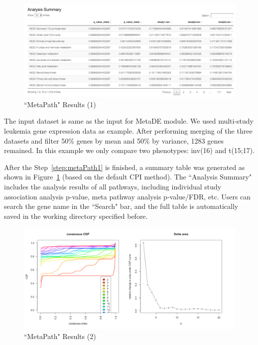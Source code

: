 \begin{figure}[H]
\begin{center}
\includegraphics[scale=0.4]{./figure/metaPath/metaPathresult1.png}
\caption{``MetaPath" Results (1)}
\label{fig:MetaPathresult1}
\end{center}
\end{figure}

The input dataset is same as the input for MetaDE module.
We used multi-study leukemia gene expression data as example.
After performing merging of the three datasets and filter 50\% genes by mean and 50\% by variance, 1283 genes remained.
In this example we only compare two phenotypes: inv(16) and t(15;17).

After the Step~\ref{step:metaPath1} is finished, a summary table was generated as shown in Figure~\ref{fig:MetaPathresult1} (based on the default CPI method). The ``Analysis Summary" includes the analysis results of all pathways, including individual study association analysis p-value, meta pathway analysis p-value/FDR, etc. Users can search the gene name in the ``Search" bar, and the full table is automatically saved in the working directory specified before.  

\begin{figure}[H]
\begin{center}
\includegraphics[scale=0.5]{./figure/metaPath/metaPathresult2.png}
\caption{``MetaPath" Results (2)}
\label{fig:MetaPathresult2}
\end{center}
\end{figure}

